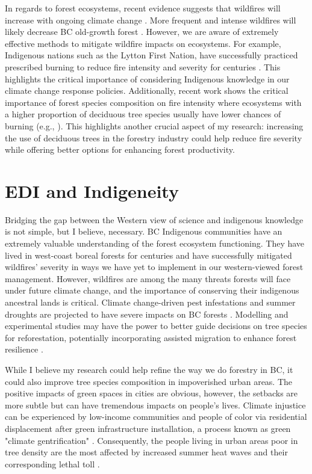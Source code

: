 \documentclass[11pt,letter]{article}
\begin{document}
In regards to forest ecosystems, recent evidence suggests that wildfires will increase with ongoing climate change \citep{wasserman_climate_2023}. More frequent and intense wildfires will likely decrease BC old-growth forest \citep{price_conflicting_2021}. However, we are aware of extremely effective methods to mitigate wildfire impacts on ecosystems. For example, Indigenous nations such as the Lytton First Nation, have successfully practiced prescribed burning to reduce fire intensity and severity for centuries \citep{lewis_return_2018}. This highlights the critical importance of considering Indigenous knowledge in our climate change response policies. Additionally, recent work shows the critical importance of forest species composition on fire intensity where ecosystems with a higher proportion of deciduous tree species usually have lower chances of burning (e.g., \cite{park_impact_2024}). This highlights another crucial aspect of my research: increasing the use of deciduous trees in the forestry industry could help reduce fire severity while offering better options for enhancing forest productivity.



\section *{EDI and Indigeneity}
Bridging the gap between the Western view of science and indigenous knowledge is not simple, but I believe, necessary. BC Indigenous communities have an extremely valuable understanding of the forest ecosystem functioning. They have lived in west-coast boreal forests for centuries and have successfully mitigated wildfires' severity in ways we have yet to implement in our western-viewed forest management. However, wildfires are among the many threats forests will face under future climate change, and the importance of conserving their indigenous ancestral lands is critical. Climate change-driven pest infestations and summer droughts are projected to have severe impacts on BC forests \citep{williams_climate_2002}. Modelling and experimental studies may have the power to better guide decisions on tree species for reforestation, potentially incorporating assisted migration to enhance forest resilience \citep{aitken_time_2016}.

While I believe my research could help refine the way we do forestry in BC, it could also improve tree species composition in impoverished urban areas. The positive impacts of green spaces in cities are obvious, however, the setbacks are more subtle but can have tremendous impacts on people's lives. Climate injustice can be experienced by low-income communities and people of color via residential displacement after green infrastructure installation, a process known as green "climate gentrification" \citep{anguelovski_why_2019}. Consequently, the people living in urban areas poor in tree density are the most affected by increased summer heat waves and their corresponding lethal toll \citep{anguelovski_why_2019}.
\end{document}
